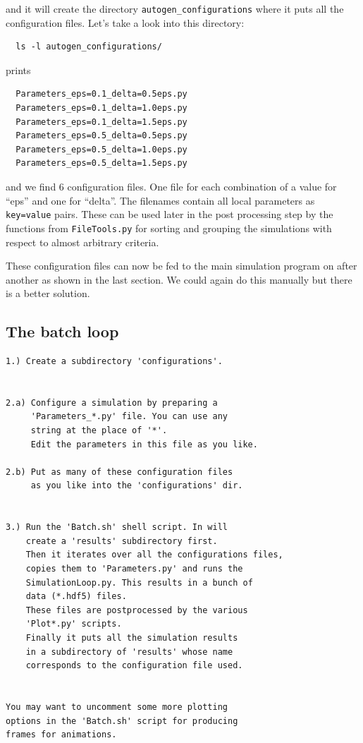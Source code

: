 \documentclass[a4paper,10pt]{report}
\begin{document}
and it will create the directory \texttt{autogen\_configurations} where it puts
all the configuration files. Let's take a look into this directory:

\begin{verbatim}
  ls -l autogen_configurations/
\end{verbatim}

prints

\begin{verbatim}
  Parameters_eps=0.1_delta=0.5eps.py
  Parameters_eps=0.1_delta=1.0eps.py
  Parameters_eps=0.1_delta=1.5eps.py
  Parameters_eps=0.5_delta=0.5eps.py
  Parameters_eps=0.5_delta=1.0eps.py
  Parameters_eps=0.5_delta=1.5eps.py
\end{verbatim}

and we find 6 configuration files. One file for each combination of a value for
``eps'' and one for ``delta''. The filenames contain all local parameters as \texttt{key=value}
pairs. These can be used later in the post processing step by the functions from
\texttt{FileTools.py} for sorting and grouping the simulations with respect to
almost arbitrary criteria.

These configuration files can now be fed to the main simulation program on after
another as shown in the last section. We could again do this manually but there is
a better solution.

\subsection{The batch loop}

\begin{verbatim}
1.) Create a subdirectory 'configurations'.


2.a) Configure a simulation by preparing a
     'Parameters_*.py' file. You can use any
     string at the place of '*'.
     Edit the parameters in this file as you like.

2.b) Put as many of these configuration files
     as you like into the 'configurations' dir.


3.) Run the 'Batch.sh' shell script. In will
    create a 'results' subdirectory first.
    Then it iterates over all the configurations files,
    copies them to 'Parameters.py' and runs the
    SimulationLoop.py. This results in a bunch of
    data (*.hdf5) files.
    These files are postprocessed by the various
    'Plot*.py' scripts.
    Finally it puts all the simulation results
    in a subdirectory of 'results' whose name
    corresponds to the configuration file used.


You may want to uncomment some more plotting
options in the 'Batch.sh' script for producing
frames for animations.
\end{verbatim}
\end{document}

